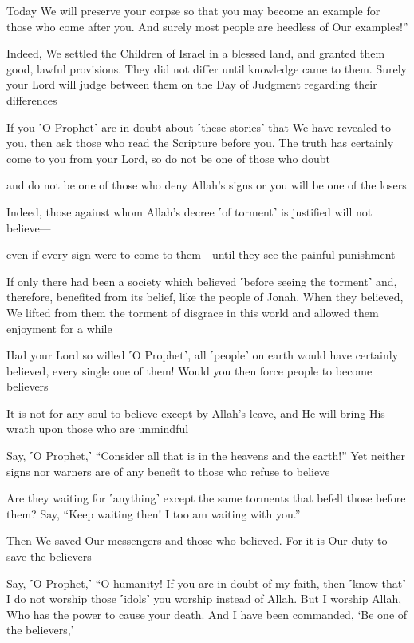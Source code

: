 Today We will preserve your corpse so that you may become an example for those who come after you. And surely most people are heedless of Our examples!”

Indeed, We settled the Children of Israel in a blessed land, and granted them good, lawful provisions. They did not differ until knowledge came to them. Surely your Lord will judge between them on the Day of Judgment regarding their differences

If you ˹O Prophet˺ are in doubt about ˹these stories˺ that We have revealed to you, then ask those who read the Scripture before you. The truth has certainly come to you from your Lord, so do not be one of those who doubt

and do not be one of those who deny Allah’s signs or you will be one of the losers

Indeed, those against whom Allah’s decree ˹of torment˺ is justified will not believe—

even if every sign were to come to them—until they see the painful punishment

If only there had been a society which believed ˹before seeing the torment˺ and, therefore, benefited from its belief, like the people of Jonah. When they believed, We lifted from them the torment of disgrace in this world and allowed them enjoyment for a while

Had your Lord so willed ˹O Prophet˺, all ˹people˺ on earth would have certainly believed, every single one of them! Would you then force people to become believers

It is not for any soul to believe except by Allah’s leave, and He will bring His wrath upon those who are unmindful

Say, ˹O Prophet,˺ “Consider all that is in the heavens and the earth!” Yet neither signs nor warners are of any benefit to those who refuse to believe

Are they waiting for ˹anything˺ except the same torments that befell those before them? Say, “Keep waiting then! I too am waiting with you.”

Then We saved Our messengers and those who believed. For it is Our duty to save the believers

Say, ˹O Prophet,˺ “O humanity! If you are in doubt of my faith, then ˹know that˺ I do not worship those ˹idols˺ you worship instead of Allah. But I worship Allah, Who has the power to cause your death. And I have been commanded, ‘Be one of the believers,’

